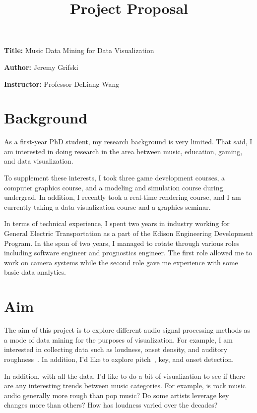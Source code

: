 \documentclass[12pt, a4paper]{article}
\title{Project Proposal}
\author{}
\date{}
\newcommand{\namelistlabel}[1]{\mbox{#1}\hfil}
\newenvironment{namelist}[1]{%
\begin{list}{}
    {
        \let\makelabel\namelistlabel
        \settowidth{\labelwidth}{#1}
        \setlength{\leftmargin}{1.1\labelwidth}
    }
  }{%
\end{list}}
\begin{document}
\maketitle

\begin{namelist}{xxxxxxxxxxxx}
\item[{\bf Title:}]
	Music Data Mining for Data Visualization
\item[{\bf Author:}]
	Jeremy Grifski
\item[{\bf Instructor:}]
	Professor DeLiang Wang
\end{namelist}

\section*{Background}

As a first-year PhD student, my research background is very limited. That said,
I am interested in doing research in the area between music, education, gaming,
and data visualization.

To supplement these interests, I took three game development courses, a
computer graphics course, and a modeling and simulation course during undergrad.
In addition, I recently took a real-time rendering course, and I am
currently taking a data visualization course and a graphics seminar.

In terms of technical experience, I spent two years in industry working for
General Electric Transportation as a part of the Edison Engineering Development
Program. In the span of two years, I managed to rotate through various roles
including software engineer and prognostics engineer. The first role allowed
me to work on camera systems while the second role gave me experience with
some basic data analytics.

\section*{Aim}

The aim of this project is to explore different audio signal processing methods
as a mode of data mining for the purposes of visualization. For example, I am
interested in collecting data such as loudness, onset density, and auditory
roughness~\cite{jeong}. In addition, I'd like to explore pitch~\cite{cuadra}, 
key, and onset detection.

In addition, with all the data, I'd like to do a bit of visualization to see
if there are any interesting trends between music categories. For example,
is rock music audio generally more rough than pop music? Do some artists
leverage key changes more than others? How has loudness varied over the
decades?
\end{document}
